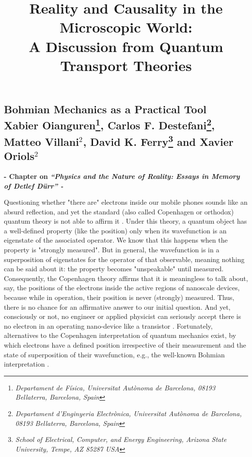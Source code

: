 \documentclass[11pt, a4paper]{article} %
\title{\vspace{-2cm} {\bf Reality and Causality in the Microscopic World:\\ A Discussion from Quantum Transport Theories}
\vspace{-0.4cm}}
\date{\vspace{-11ex}}
\begin{document}
\setcounter{page}{1}
\begin{center}
\section*{ Bohmian Mechanics as a Practical Tool \vspace{0.2cm}\vspace{0.1cm}\\ \small Xabier Oianguren\footnote{\em Departament de Física, Universitat Autònoma de Barcelona, 08193 Bellaterra, Barcelona, Spain}, Carlos F. Destefani\footnote{\em Departament d’Enginyeria Electrònica, Universitat Autònoma de Barcelona, 08193 Bellaterra, Barcelona, Spain}, Matteo Villani$^2$, David K. Ferry\footnote{\em School of Electrical, Computer, and Energy Engineering, Arizona State University, Tempe,
AZ 85287 USA} and Xavier Oriols$^2$}

\vspace{-0.5cm}
{\bf \small - Chapter on {\em “Physics and the Nature of Reality: Essays in Memory of Detlef Dürr” - }}\vspace{-0.32cm}
\end{center}

\hspace*{4mm} Questioning whether "there are" electrons inside our mobile phones sounds like an absurd reflection, and yet the standard (also called Copenhagen or orthodox) quantum theory is not able to affirm it \cite{where, consp}. Under this theory, a quantum object has a well-defined property (like the position) only when its wavefunction is an eigenstate of the associated operator. We know that this happens when the property is "strongly measured". But in general, the wavefunction is in a superposition of eigenstates for the operator of that observable, meaning nothing can be said about it: the property becomes "unspeakable" until measured. Consequently, the Copenhagen theory affirms that it is meaningless to talk about, say, the positions of the electrons inside the active regions of nanoscale devices, because while in operation, their position is never (strongly) measured. Thus, there is no chance for an affirmative answer to our initial question. And yet, consciously or not, no engineer or applied physicist can seriously accept there is no electron in an operating nano-device like a transistor \cite{where, consp}. Fortunately, alternatives to the Copenhagen interpretation of quantum mechanics exist, by which electrons have a defined position irrespective of their measurement and the state of superposition of their wavefunction, e.g., the well-known Bohmian interpretation \cite{Bohm,Holland, Durr,JordiXavier}. \vspace{-0.1cm} 
\end{document}
